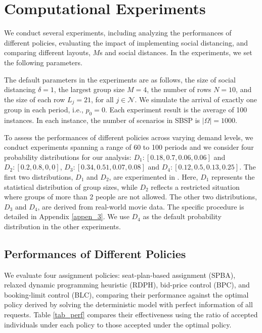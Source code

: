 \section{Computational Experiments}\label{sec_result}
We conduct several experiments, including analyzing the performances of different policies, evaluating the impact of implementing social distancing, and comparing different layouts, $M$s and social distances. In the experiments, we set the following parameters. 

The default parameters in the experiments are as follows, the size of social distancing $\delta =1$, the largest group size $M =4$, the number of rows $N = 10$, and the size of each row $L_j = 21$, for all $j \in \mathcal{N}$. We simulate the arrival of exactly one group in each period, i.e., $p_0 = 0$. Each experiment result is the average of 100 instances. In each instance, the number of scenarios in SBSP is $|\Omega| = 1000$.

To assess the performances of different policies across varying demand levels, we conduct experiments spanning a range of 60 to 100 periods and we consider four probability distributions for our analysis: $D_1:[0.18,0.7,0.06,0.06]$ and $D_2:[0.2,0.8,0,0]$, $D_3: [0.34, 0.51, 0.07, 0.08]$ and $D_4: [0.12, 0.5, 0.13, 0.25]$. The first two distributions, $D_1$ and $D_2$, are experimented in \cite{blom2022filling}. Here, $D_1$ represents the statistical distribution of group sizes, while $D_2$ reflects a restricted situation where groups of more than 2 people are not allowed. The other two distributions, $D_3$ and $D_4$, are derived from real-world movie data. The specific procedure is detailed in Appendix \ref{appen_3}. We use $D_4$ as the default probability distribution in the other experiments.


\subsection{Performances of Different Policies}
We evaluate four assignment policies: seat-plan-based assignment (SPBA), relaxed dynamic programming heuristic (RDPH), bid-price control (BPC), and booking-limit control (BLC), comparing their performance against the optimal policy derived by solving the deterministic model with perfect information of all requests. Table \ref{tab_perf} compares their effectiveness using the ratio of accepted individuals under each policy to those accepted under the optimal policy.


